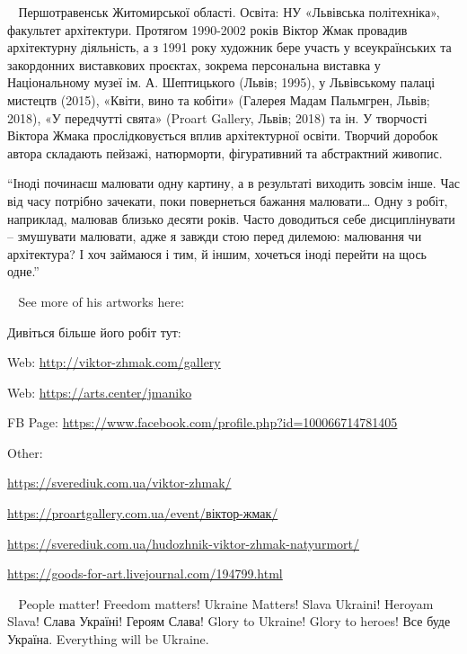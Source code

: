 💙💛
Першотравенськ Житомирської області. Освіта: НУ «Львівська політехніка»,
факультет архітектури. Протягом 1990-2002 років Віктор Жмак провадив
архітектурну діяльність, а з 1991 року художник бере участь у всеукраїнських та
закордонних виставкових проєктах, зокрема персональна виставка у Національному
музеї ім. А. Шептицького (Львів; 1995), у Львівському палаці мистецтв (2015),
«Квіти, вино та кобіти» (Галерея Мадам Пальмгрен, Львів; 2018), «У передчутті
свята» (Proart Gallery, Львів; 2018) та ін. У творчості Віктора Жмака
прослідковується вплив архітектурної освіти. Творчий доробок автора складають
пейзажі, натюрморти, фігуративний та абстрактний живопис.

\enquote{Іноді починаєш малювати одну картину, а в результаті виходить зовсім інше. Час
від часу потрібно зачекати, поки повернеться бажання малювати… Одну з робіт,
наприклад, малював близько десяти років. Часто доводиться себе дисциплінувати –
змушувати малювати, адже я завжди стою перед дилемою: малювання чи архітектура?
І хоч займаюся і тим, й іншим, хочеться іноді перейти на щось одне.}

💙💛
See more of his artworks here:

Дивіться більше його робіт тут:

Web: \url{http://viktor-zhmak.com/gallery}  

Web: \url{https://arts.center/jmaniko} 

FB Page: \url{https://www.facebook.com/profile.php?id=100066714781405} 

Other:

\url{https://sverediuk.com.ua/viktor-zhmak/} 

\url{https://proartgallery.com.ua/event/віктор-жмак/}  

\url{https://sverediuk.com.ua/hudozhnik-viktor-zhmak-natyurmort/} 

\url{https://goods-for-art.livejournal.com/194799.html} 

💙💛 People matter! Freedom matters! Ukraine Matters! Slava Ukraini! Heroyam
Slava! Слава Україні! Героям Слава! Glory to Ukraine! Glory to heroes! Все буде
Україна. Everything will be Ukraine.
